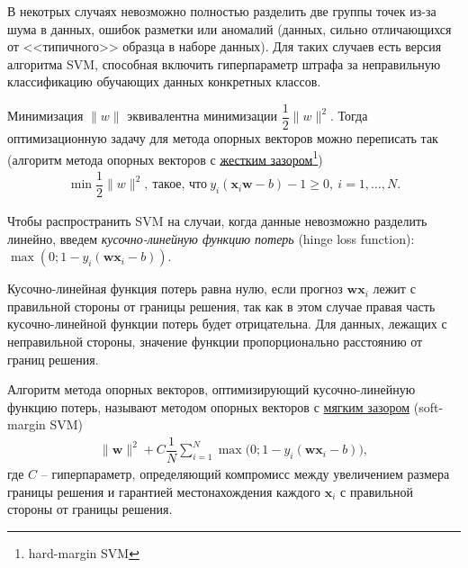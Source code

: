 \documentclass[%
	11pt,
	a4paper,
	utf8,
		]{article}
\begin{document}
В некотрых случаях невозможно полностью разделить две группы точек из-за шума в данных, ошибок разметки или аномалий (данных, сильно отличающихся от <<типичного>> образца в наборе данных). Для таких случаев есть версия алгоритма SVM, способная включить гиперпараметр штрафа за неправильную классификацию обучающих данных конкретных классов.


Минимизация $ \| w \| $ эквивалентна минимизации $ \dfrac{1}{2} \| w \|^2 $. Тогда оптимизационную задачу для метода опорных векторов можно переписать так (алгоритм метода опорных векторов с \underline{жестким зазором}\footnote{hard-margin SVM})
\begin{align}\label{eq:svm_hard_margin}
	\min \dfrac{1}{2} \| w \|^2,\ \text{такое, что}\ y_i (\mathbf{x}_i \mathbf{w} - b) - 1\geqslant 0, \ i = 1,\ldots, N.
\end{align}

Чтобы распространить SVM на случаи, когда данные невозможно разделить линейно, введем \emph{кусочно-линейную функцию потерь} (hinge loss function): $ \max (0; 1 - y_i (\mathbf{w} \mathbf{x}_i - b)) $.

Кусочно-линейная функция потерь равна нулю, если прогноз $ \mathbf{w} \mathbf{x}_i $ лежит с правильной стороны от границы решения, так как в этом случае правая часть кусочно-линейной функции потерь будет отрицательна. Для данных, лежащих с неправильной стороны, значение функции пропорционально расстоянию от границ решения.

Алгоритм метода опорных векторов, оптимизирующий кусочно-линейную функцию потерь, называют методом опорных векторов с \underline{мягким зазором} (soft-margin SVM)
\begin{align*}
	\| \mathbf{w} \|^2 + C \dfrac{1}{N} \sum_{i=1}^N \max \big(0; 1 - y_i (\mathbf{w} \mathbf{x}_i - b)\big),
\end{align*}
где $ C $ -- гиперпараметр, определяющий компромисс между увеличением размера границы решения и гарантией местонахождения каждого $ \mathbf{x}_i $ с правильной стороны от границы решения.
\end{document}
